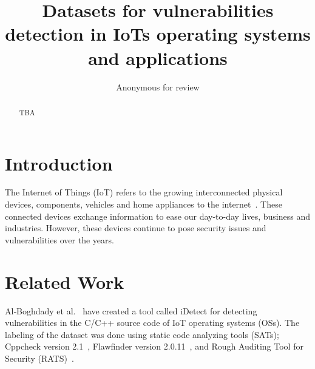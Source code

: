 \documentclass[sigconf,screen,balance,natbib=false,timestamp=false,urlbreakonhyphens=true]{acmart}
\begin{document}
%
\title{Datasets for vulnerabilities detection in IoTs operating systems and applications}

\author{
    Anonymous for review
}



\begin{abstract}
TBA
\end{abstract}


\maketitle

\section{Introduction}

The Internet of Things (IoT) refers to the growing interconnected physical devices, 
components, vehicles and home appliances to the internet~\cite{oracle2023:what}.
These connected devices exchange information to ease our day-to-day lives, business and industries. 
However, these devices continue to pose security issues and vulnerabilities over the years. 



\section{Related Work}

Al‑Boghdady et al.~\cite{al-boghdady2022:idetect} have created a tool called iDetect for detecting 
vulnerabilities in the C/C++ source code of IoT operating systems (OSs). 
The labeling of the dataset was done using static code analyzing tools (SATs);
Cppcheck version 2.1~\cite{cppcheck2.12021:tool}, 
Flawfinder version 2.0.11~\cite{dwheeler2021:flawfinder}, 
and Rough Auditing Tool for Security (RATS)~\cite{rats2021:rough}.
\end{document}
